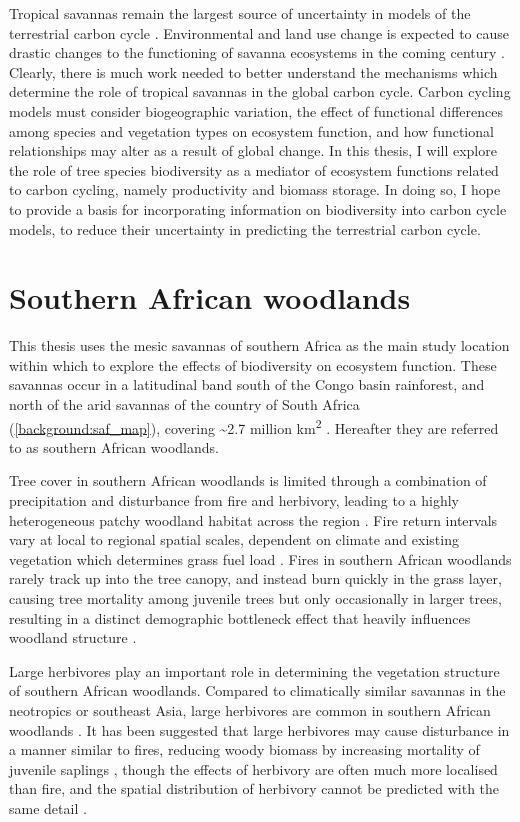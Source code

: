\begin{refsection}
Tropical savannas remain the largest source of uncertainty in models of the terrestrial carbon cycle \citep{Ahlstrom2015}. Environmental and land use change is expected to cause drastic changes to the functioning of savanna ecosystems in the coming century \citep{Ross2021}. Clearly, there is much work needed to better understand the mechanisms which determine the role of tropical savannas in the global carbon cycle. Carbon cycling models must consider biogeographic variation, the effect of functional differences among species and vegetation types on ecosystem function, and how functional relationships may alter as a result of global change. In this thesis, I will explore the role of tree species biodiversity as a mediator of ecosystem functions related to carbon cycling, namely productivity and biomass storage. In doing so, I hope to provide a basis for incorporating information on biodiversity into carbon cycle models, to reduce their uncertainty in predicting the terrestrial carbon cycle.

\section{Southern African woodlands}
\label{background:sec:southern_african}

This thesis uses the mesic savannas of southern Africa as the main study location within which to explore the effects of biodiversity on ecosystem function. These savannas occur in a latitudinal band south of the Congo basin rainforest, and north of the arid savannas of the country of South Africa (\autoref{background:saf_map}), covering \textasciitilde{}2.7 million km\textsuperscript{2} \citep{Arino2010}. Hereafter they are referred to as southern African woodlands.

Tree cover in southern African woodlands is limited through a combination of precipitation and disturbance from fire and herbivory, leading to a highly heterogeneous patchy woodland habitat across the region \citep{Archibald2019}. Fire return intervals vary at local to regional spatial scales, dependent on climate and existing vegetation which determines grass fuel load \citep{Archibald2010}. Fires in southern African woodlands rarely track up into the tree canopy, and instead burn quickly in the grass layer, causing tree mortality among juvenile trees but only occasionally in larger trees, resulting in a distinct demographic bottleneck effect that heavily influences woodland structure \citep{Frost1996}. 

Large herbivores play an important role in determining the vegetation structure of southern African woodlands. Compared to climatically similar savannas in the neotropics or southeast Asia, large herbivores are common in southern African woodlands \citep{Asner2009}. It has been suggested that large herbivores may cause disturbance in a manner similar to fires, reducing woody biomass by increasing mortality of juvenile saplings \citep{Bond2005}, though the effects of herbivory are often much more localised than fire, and the spatial distribution of herbivory cannot be predicted with the same detail \citep{Hempson2015}. 


\end{refsection}
